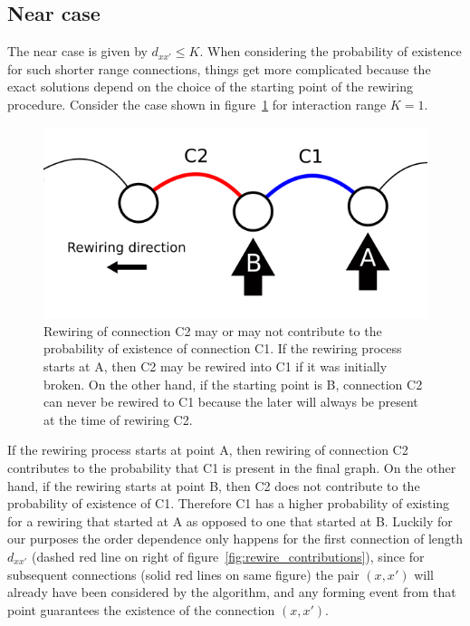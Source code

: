 \subsection*{Near case}

The near case is given by $d_{xx'}\leq K$. When considering the probability of existence for such shorter range connections, things get
more complicated because the exact solutions depend on the choice of the starting point of the rewiring procedure. Consider the case
shown in figure~\ref{fig:order_dependence} for interaction range $K=1$.

\begin{figure}[!ht]
  \centering
  \includegraphics[width=0.7\linewidth]{fig/order_dependence.png}
  \caption{Rewiring of connection C2 may or may not contribute to the probability of existence of connection C1. If the rewiring
  process starts at A, then C2 may be rewired into C1 if it was initially broken. On the other hand, if the starting point is B,
  connection C2 can never be rewired to C1 because the later will always be present at the time of rewiring C2.}

  \label{fig:order_dependence}
\end{figure}

If the rewiring process starts at point A, then rewiring of connection C2 contributes to the probability that C1 is present in the
final graph. On the other hand, if the rewiring starts at point B, then C2 does not contribute to the probability of existence of C1.
Therefore C1 has a higher probability of existing for a rewiring that started at A as opposed to one that started at B. Luckily for our
purposes the order dependence only happens for the first connection of length $d_{xx'}$ (dashed {\color{red}red} line on right of
figure~\ref{fig:rewire_contributions}), since for subsequent connections (solid {\color{red}red} lines on same figure) the pair
$(x,x')$ will already have been considered by the algorithm, and any forming event from that point guarantees the existence of the
connection $(x,x')$.

